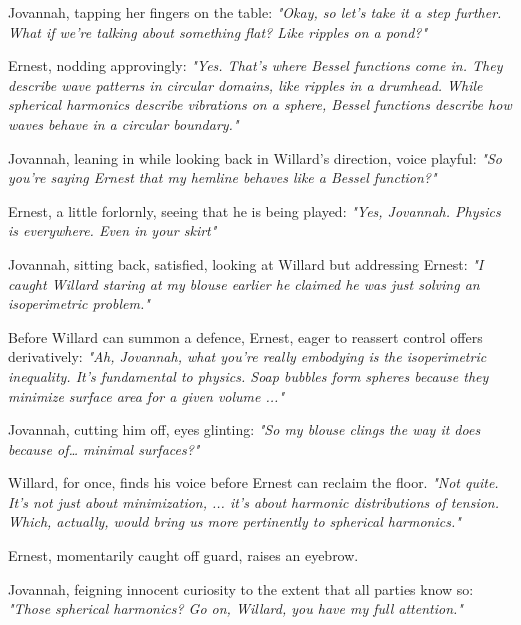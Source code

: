 \bigskip

Jovannah, tapping her fingers on the table: \textit{"Okay, so let’s take it a step further. What if we’re talking about something flat? Like ripples on a pond?"}

\bigskip

Ernest, nodding approvingly: \textit{"Yes. That’s where Bessel functions come in. They describe wave patterns in circular domains, like ripples in a drumhead. While spherical harmonics describe vibrations on a sphere, Bessel functions describe how waves behave in a circular boundary."}

\bigskip

Jovannah, leaning in while looking back in Willard's direction, voice playful: \textit{"So you're saying Ernest that my hemline behaves like a Bessel function?"}

\bigskip

Ernest, a little forlornly, seeing that he is being played: \textit{"Yes, Jovannah. Physics is everywhere. Even in your skirt"}

\bigskip

Jovannah, sitting back, satisfied, looking at Willard but addressing Ernest: \textit{"I caught Willard staring at my blouse earlier he claimed he was just solving an isoperimetric problem."}

Before Willard can summon a defence, Ernest, eager to reassert control offers derivatively: \textit{"Ah, Jovannah, what you’re really embodying is the isoperimetric inequality. It’s fundamental to physics. Soap bubbles form spheres because they minimize surface area for a given volume ..."}  

\bigskip

Jovannah, cutting him off, eyes glinting:  
\textit{"So my blouse clings the way it does because of… minimal surfaces?"}  

\bigskip

Willard, for once, finds his voice before Ernest can reclaim the floor.  \textit{"Not quite. It’s not just about minimization, ... it’s about harmonic distributions of tension. Which, actually, would bring us more pertinently to spherical harmonics."}  

\bigskip

Ernest, momentarily caught off guard, raises an eyebrow.  

\bigskip

Jovannah, feigning innocent curiosity to the extent that all parties know so: \textit{"Those spherical harmonics? Go on, Willard, you have my full attention."}


